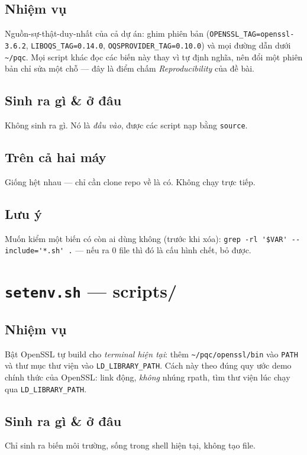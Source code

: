 \documentclass[11pt,a4paper]{article}
\begin{document}
\subsection*{Nhiệm vụ}
Nguồn-sự-thật-duy-nhất của cả dự án: ghim phiên bản (\verb|OPENSSL_TAG=openssl-3.6.2|, \verb|LIBOQS_TAG=0.14.0|, \verb|OQSPROVIDER_TAG=0.10.0|) và mọi đường dẫn dưới \verb|~/pqc|. Mọi script khác đọc các biến này thay vì tự định nghĩa, nên đổi một phiên bản chỉ sửa một chỗ — đây là điểm chấm \emph{Reproducibility} của đề bài.

\subsection*{Sinh ra gì \& ở đâu}
Không sinh ra gì. Nó là \emph{đầu vào}, được các script nạp bằng \verb|source|.

\subsection*{Trên cả hai máy}
Giống hệt nhau — chỉ cần clone repo về là có. Không chạy trực tiếp.

\subsection*{Lưu ý}
Muốn kiểm một biến có còn ai dùng không (trước khi xóa): \verb|grep -rl '$VAR' --include='*.sh' .| — nếu ra 0 file thì đó là cấu hình chết, bỏ được.

\section{\texttt{setenv.sh} — \textmd{\normalsize scripts/}}

\subsection*{Nhiệm vụ}
Bật OpenSSL tự build cho \emph{terminal hiện tại}: thêm \verb|~/pqc/openssl/bin| vào \verb|PATH| và thư mục thư viện vào \verb|LD_LIBRARY_PATH|. Cách này theo đúng quy ước demo chính thức của OpenSSL: link động, \emph{không} nhúng rpath, tìm thư viện lúc chạy qua \verb|LD_LIBRARY_PATH|.

\subsection*{Sinh ra gì \& ở đâu}
Chỉ sinh ra biến môi trường, sống trong shell hiện tại, không tạo file.
\end{document}
